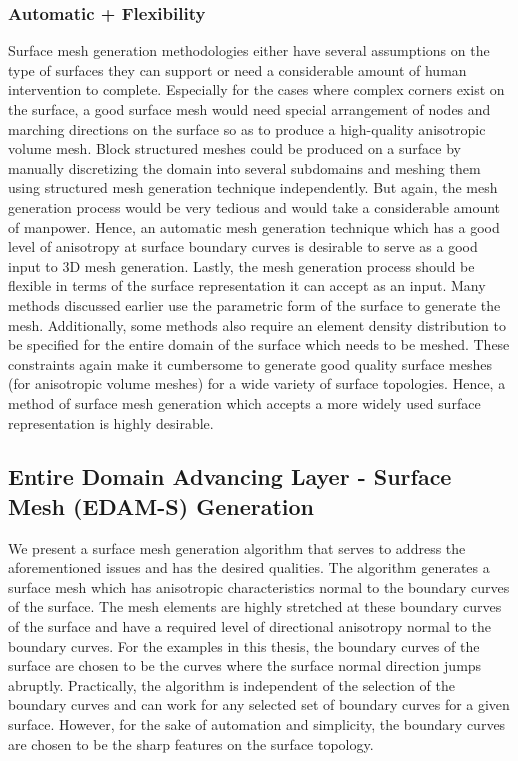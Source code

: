 \subsubsection{Automatic + Flexibility}

Surface mesh generation methodologies either have several assumptions on the type of surfaces they can support or need a considerable amount of human intervention to complete. Especially for the cases where complex corners exist on the surface, a good surface mesh would need special arrangement of nodes and marching directions on the surface so as to produce a high-quality anisotropic volume mesh. Block structured meshes could be produced on a surface by manually discretizing the domain into several subdomains and meshing them using structured mesh generation technique independently. But again, the mesh generation process would be very tedious and would take a considerable amount of manpower. Hence, an automatic mesh generation technique which has a good level of anisotropy at surface boundary curves is desirable to serve as a good input to 3D mesh generation. Lastly, the mesh generation process should be flexible in terms of the surface representation it can accept as an input. Many methods discussed earlier use the parametric form of the surface to generate the mesh. Additionally, some methods also require an element density distribution to be specified for the entire domain of the surface which needs to be meshed. These constraints again make it cumbersome to generate good quality surface meshes (for anisotropic volume meshes) for a wide variety of surface topologies. Hence, a method of surface mesh generation which accepts a more widely used surface representation is highly desirable.

\subsection{Entire Domain Advancing Layer - Surface Mesh (EDAM-S) Generation}

We present a surface mesh generation algorithm that serves to address the aforementioned issues and has the desired qualities. The algorithm generates a surface mesh which has anisotropic characteristics normal to the boundary curves of the surface. The mesh elements are highly stretched at these boundary curves of the surface and have a required level of directional anisotropy normal to the boundary curves. For the examples in this thesis, the boundary curves of the surface are chosen to be the curves where the surface normal direction jumps abruptly. Practically, the algorithm is independent of the selection of the boundary curves and can work for any selected set of boundary curves for a given surface. However, for the sake of automation and simplicity, the boundary curves are chosen to be the sharp features on the surface topology.

